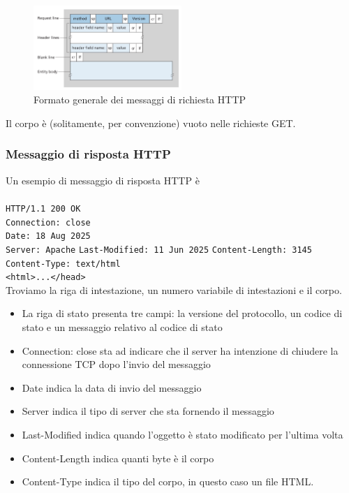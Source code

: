 \documentclass{book}
\begin{document}
\begin{figure}[h]
	\centering
	\includegraphics[width=0.5\textwidth]{images/http_request_message.png}
	\caption{Formato generale dei messaggi di richiesta HTTP}
	\label{fig:esempio}
\end{figure}

Il corpo è (solitamente, per convenzione) vuoto nelle richieste GET.

\subsubsection*{Messaggio di risposta HTTP}
Un esempio di messaggio di risposta HTTP è
\\\\
\texttt{HTTP/1.1 200 OK}\\
\texttt{Connection: close}\\
\texttt{Date: 18 Aug 2025}\\
\texttt{Server: Apache}
\texttt{Last-Modified: 11 Jun 2025}
\texttt{Content-Length: 3145}\\
\texttt{Content-Type: text/html}\\
\texttt{<html>...</head>}\\

Troviamo la riga di intestazione, un numero variabile di intestazioni e il corpo.

\begin{itemize}
	\item La riga di stato presenta tre campi: la versione del protocollo, un codice di stato e un messaggio relativo al codice di stato
	\item Connection: close sta ad indicare che il server ha intenzione di chiudere la connessione TCP dopo l'invio del messaggio
	\item Date indica la data di invio del messaggio
	\item Server indica il tipo di server che sta fornendo il messaggio
	\item Last-Modified indica quando l'oggetto è stato modificato per l'ultima volta
	\item Content-Length indica quanti byte è il corpo
	\item Content-Type indica il tipo del corpo, in questo caso un file HTML.
\end{itemize}
\end{document}
